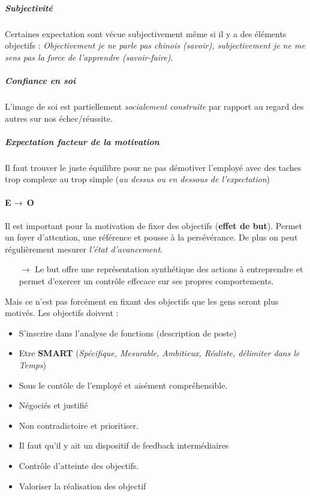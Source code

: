 \documentclass[11pt]{article} %
\begin{document}
\subparagraph{Subjectivité} 
Certaines expectation sont vécue subjectivement même si il y a des
éléments objectifs : \textit{Objectivement je ne parle pas chinois
(savoir), subjectivement je ne me sens pas la force de
l'apprendre (savoir-faire)}.

\subparagraph{Confiance en soi}
L'image de soi est partiellement \textit{socialement construite} par
rapport au regard des autres sur nos échec/réussite.


\subparagraph{Expectation facteur de la motivation} Il faut trouver le
juste équilibre pour ne pas démotiver l'employé avec des taches trop
complexe au trop simple (\textit{au dessus ou en dessous de l'expectation})

\paragraph{\textbf{E $\bf \to$ O}}

Il est important pour la motivation de fixer des objectifs
(\textbf{effet de but}). Permet un foyer d'attention, une référence
et pousse à la persévérance. De plus on peut régulièrement mesurer
\textit{l'état d'avancement}.

\begin{itemize}
    \item[$\to$] Le but offre une représentation synthétique des actions à
        entreprendre et permet d'exercer un contrôle effecace sur ses
        propres comportements.
\end{itemize}

Mais ce n'est pas forcément en fixant des objectifs que les gens seront
plus motivés. Les objectifs doivent :
\begin{itemize}
 \item S'inscrire dans l'analyse de fonctions (description de poste)
 \item Etre \textbf{SMART} (\textit{Spécifique, Mesurable,
     Ambitieux, Réaliste, délimiter dans le Temps}) 
 \item Sous le contôle de l'employé et aisément compréhensible.
 \item Négociés et justifié
 \item Non contradictoire et prioritiser.
 \item Il faut qu'il y ait un dispositif de feedback intermédiaires
 \item Contrôle d'atteinte des objectifs.
 \item Valoriser la réalisation des objectif
\end{itemize}
\end{document}
